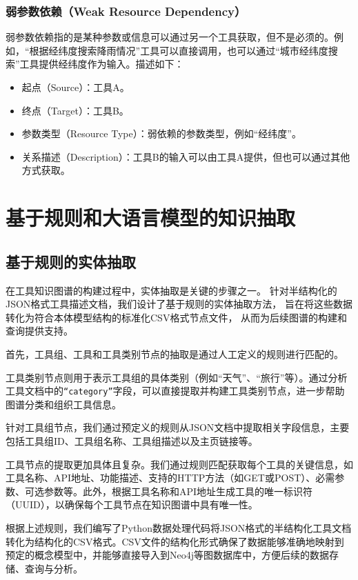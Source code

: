 \subsubsection{弱参数依赖（Weak Resource Dependency）}
弱参数依赖指的是某种参数或信息可以通过另一个工具获取，但不是必须的。例如，“根据经纬度搜索降雨情况”工具可以直接调用，也可以通过“城市经纬度搜索”工具提供经纬度作为输入。描述如下：
\begin{itemize}
    \item 起点（Source）：工具A。
    \item 终点（Target）：工具B。
    \item 参数类型（Resource Type）：弱依赖的参数类型，例如``经纬度''。
    \item 关系描述（Description）：工具B的输入可以由工具A提供，但也可以通过其他方式获取。
\end{itemize}

\section{基于规则和大语言模型的知识抽取}

\subsection{基于规则的实体抽取}

在工具知识图谱的构建过程中，实体抽取是关键的步骤之一。
针对半结构化的JSON格式工具描述文档，我们设计了基于规则的实体抽取方法，
旨在将这些数据转化为符合本体模型结构的标准化CSV格式节点文件，
从而为后续图谱的构建和查询提供支持。

首先，工具组、工具和工具类别节点的抽取是通过人工定义的规则进行匹配的。

工具类别节点则用于表示工具组的具体类别（例如“天气”、“旅行”等）。通过分析工具文档中的\texttt{“category”}字段，可以直接提取并构建工具类别节点，进一步帮助图谱分类和组织工具信息。

针对工具组节点，我们通过预定义的规则从JSON文档中提取相关字段信息，主要包括工具组ID、工具组名称、工具组描述以及主页链接等。

工具节点的提取更加具体且复杂。我们通过规则匹配获取每个工具的关键信息，如工具名称、API地址、功能描述、支持的HTTP方法（如GET或POST）、必需参数、可选参数等。此外，根据工具名称和API地址生成工具的唯一标识符（UUID），以确保每个工具节点在知识图谱中具有唯一性。

根据上述规则，我们编写了Python数据处理代码将JSON格式的半结构化工具文档转化为结构化的CSV格式。CSV文件的结构化形式确保了数据能够准确地映射到预定的概念模型中，并能够直接导入到Neo4j等图数据库中，方便后续的数据存储、查询与分析。

